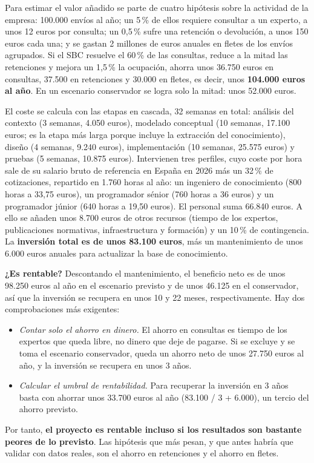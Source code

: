 \documentclass[12pt,a4paper,twoside,spanish]{article}      %
\begin{document}
Para estimar el valor añadido se parte de cuatro hipótesis sobre la actividad de la empresa: 100.000 envíos al año; un 5\,\% de ellos requiere consultar a un experto, a unos 12 euros por consulta; un 0,5\,\% sufre una retención o devolución, a unos 150 euros cada una; y se gastan 2 millones de euros anuales en fletes de los envíos agrupados. Si el SBC resuelve el 60\,\% de las consultas, reduce a la mitad las retenciones y mejora un 1,5\,\% la ocupación, ahorra unos 36.750 euros en consultas, 37.500 en retenciones y 30.000 en fletes, es decir, unos \textbf{104.000 euros al año}. En un escenario conservador se logra solo la mitad: unos 52.000 euros.

El coste se calcula con las etapas en cascada, 32 semanas en total: análisis del contexto (3 semanas, 4.050 euros), modelado conceptual (10 semanas, 17.100 euros; es la etapa más larga porque incluye la extracción del conocimiento), diseño (4 semanas, 9.240 euros), implementación (10 semanas, 25.575 euros) y pruebas (5 semanas, 10.875 euros). Intervienen tres perfiles, cuyo coste por hora sale de su salario bruto de referencia en España en 2026 más un 32\,\% de cotizaciones, repartido en 1.760 horas al año: un ingeniero de conocimiento (800 horas a 33,75 euros), un programador sénior (760 horas a 36 euros) y un programador júnior (640 horas a 19,50 euros). El personal suma 66.840 euros. A ello se añaden unos 8.700 euros de otros recursos (tiempo de los expertos, publicaciones normativas, infraestructura y formación) y un 10\,\% de contingencia. La \textbf{inversión total es de unos 83.100 euros}, más un mantenimiento de unos 6.000 euros anuales para actualizar la base de conocimiento.

\textbf{¿Es rentable?} Descontando el mantenimiento, el beneficio neto es de unos 98.250 euros al año en el escenario previsto y de unos 46.125 en el conservador, así que la inversión se recupera en unos 10 y 22 meses, respectivamente. Hay dos comprobaciones más exigentes:
\begin{itemize}\setlength{\itemsep}{0pt}
    \item \textit{Contar solo el ahorro en dinero.} El ahorro en consultas es tiempo de los expertos que queda libre, no dinero que deje de pagarse. Si se excluye y se toma el escenario conservador, queda un ahorro neto de unos 27.750 euros al año, y la inversión se recupera en unos 3 años.
    \item \textit{Calcular el umbral de rentabilidad.} Para recuperar la inversión en 3 años basta con ahorrar unos 33.700 euros al año (83.100 / 3 + 6.000), un tercio del ahorro previsto.
\end{itemize}
Por tanto, \textbf{el proyecto es rentable incluso si los resultados son bastante peores de lo previsto}. Las hipótesis que más pesan, y que antes habría que validar con datos reales, son el ahorro en retenciones y el ahorro en fletes.
\end{document}

